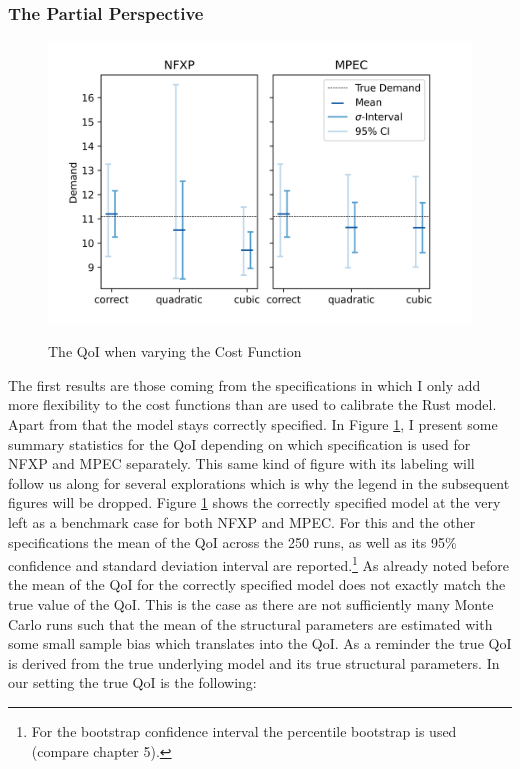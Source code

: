 \subsubsection{The Partial Perspective}

\begin{figure}[!b]
	\caption{The QoI when varying the Cost Function}
	\vspace*{-4mm}
	\centering
	\includegraphics[scale=0.9]{../figures/figure_5.png}
	\label{figure5}
\end{figure}

The first results are those coming from the specifications in which I only add more flexibility to the cost functions than are used to calibrate the Rust model. Apart from that the model stays correctly specified. In Figure \ref{figure5}, I present some summary statistics for the QoI depending on which specification is used for NFXP and MPEC separately. This same kind of figure with its labeling will follow us along for several explorations which is why the legend in the subsequent figures will be dropped. Figure \ref{figure5} shows the correctly specified model at the very left as a benchmark case for both NFXP and MPEC. For this and the other specifications the mean of the QoI across the 250 runs, as well as its 95\% confidence and standard deviation interval are reported.\footnote{For the bootstrap confidence interval the percentile bootstrap is used (compare \cite{Davison.1997} chapter 5).} As already noted before the mean of the QoI for the correctly specified model does not exactly match the true value of the QoI. This is the case as there are not sufficiently many Monte Carlo runs such that the mean of the structural parameters are estimated with some small sample bias which translates into the QoI. As a reminder the true QoI is derived from the true underlying model and its true structural parameters. In our setting the true QoI is the following:

